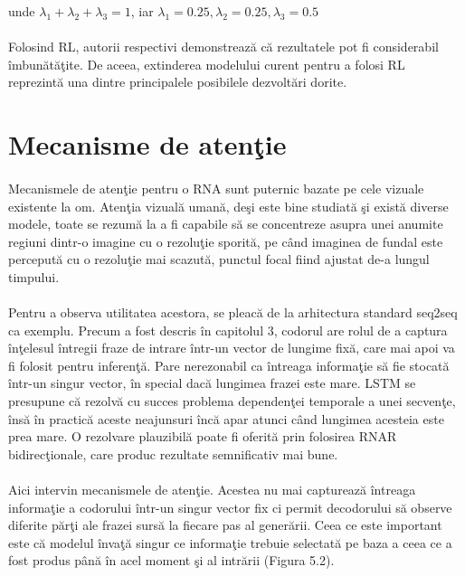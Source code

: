 unde \(\lambda_1 + \lambda_2 + \lambda_3 = 1\), iar \(\lambda_1 = 0.25, \lambda_2 = 0.25, \lambda_3 = 0.5\)

\paragraph{}
Folosind RL, autorii respectivi demonstreaz\u a c\u a rezultatele pot fi considerabil \^ imbun\u at\u a\c tite. De aceea, extinderea modelului curent pentru a folosi RL reprezint\u a una dintre principalele posibilele dezvolt\u ari dorite.

\section{Mecanisme de aten\c tie}

\paragraph{}
Mecanismele de aten\c tie pentru o RNA sunt puternic bazate pe cele vizuale existente la om. Aten\c tia vizual\u a uman\u a, de\c si este bine studiat\u a \c si exist\u a diverse modele, toate se rezum\u a la a fi capabile s\u a se concentreze asupra unei anumite regiuni dintr-o imagine cu o rezolu\c tie sporit\u a, pe c\^ and imaginea de fundal este perceput\u a cu o rezolu\c tie mai scazut\u a, punctul focal fiind ajustat de-a lungul timpului. 

\paragraph{}
Pentru a observa utilitatea acestora, se pleac\u a de la arhitectura standard seq2seq ca exemplu. Precum a fost descris \^ in capitolul 3, codorul are rolul de a captura \^ in\c telesul \^ intregii fraze de intrare \^ intr-un vector de lungime fix\u a, care mai apoi va fi folosit pentru inferen\c t\u a. Pare nerezonabil ca \^ intreaga informa\c tie s\u a fie stocat\u a \^ intr-un singur vector, \^ in special dac\u a lungimea frazei este mare. LSTM se presupune c\u a rezolv\u a cu succes problema dependen\c tei temporale a unei secven\c te, \^ ins\u a \^ in practic\u a aceste neajunsuri \^ inc\u a apar atunci c\^ and lungimea acesteia este prea mare. O rezolvare plauzibil\u a poate fi oferit\u a prin folosirea RNAR bidirec\c tionale, care produc rezultate semnificativ mai bune. 

\paragraph{}
Aici intervin mecanismele de aten\c tie. Acestea nu mai captureaz\u a \^ intreaga informa\c tie a codorului \^ intr-un singur vector fix ci permit decodorului s\u a observe diferite p\u ar\c ti ale frazei surs\u a la fiecare pas al gener\u arii. Ceea ce este important este c\u a modelul \^ inva\c t\u a singur ce informa\c tie trebuie selectat\u a pe baza a ceea ce a fost produs p\^ an\u a \^ in acel moment \c si al intr\u arii (Figura 5.2).

